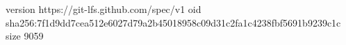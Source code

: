 version https://git-lfs.github.com/spec/v1
oid sha256:7f1d9dd7cea512e6027d79a2b45018958c09d31c2fa1c4238fbf5691b9239c1c
size 9059
